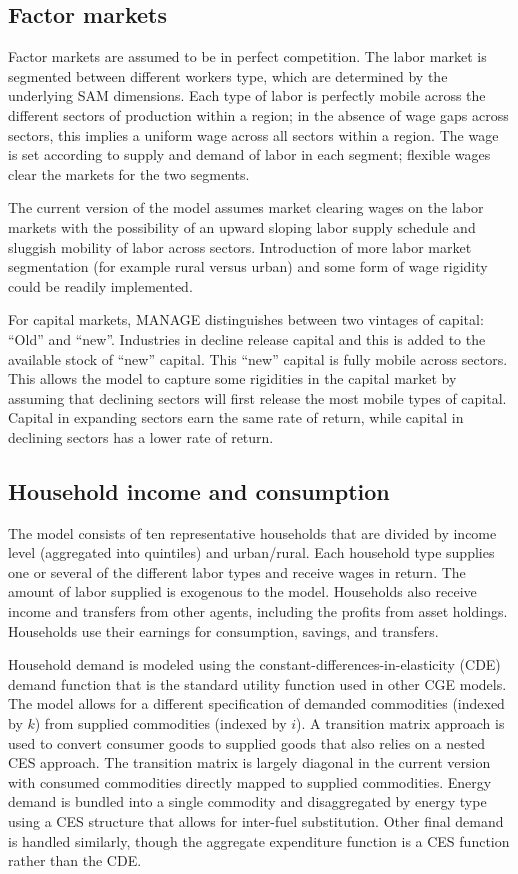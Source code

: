 \documentclass[11pt,english]{article}
\begin{document}
\subsection{Factor markets}

Factor markets are assumed to be in perfect competition. The labor market is segmented between different workers type, which are determined by the underlying SAM dimensions. Each type of labor is perfectly mobile across the different sectors of production within a region; in the absence of wage gaps across sectors, this implies a uniform wage across all sectors within a region. The wage is set according to supply and demand of labor in each segment; flexible wages clear the markets for the two segments.

The current version of the model assumes market clearing wages on the labor markets with the possibility of an upward sloping labor supply schedule and sluggish mobility of labor across sectors. Introduction of more labor market segmentation (for example rural versus urban) and some form of wage rigidity could be readily implemented.


For capital markets, MANAGE distinguishes between two vintages of capital: ``Old'' and ``new''. Industries in decline release capital and this is added to the available stock of ``new'' capital. This ``new'' capital is fully mobile across sectors. This allows the model to capture some rigidities in the capital market by assuming that declining sectors will first release the most mobile types of capital. Capital in expanding sectors earn the same rate of return, while capital in declining sectors has a lower rate of return.

\subsection{Household income and consumption}

The model consists of ten representative households that are divided by income level (aggregated into quintiles) and urban/rural. Each household type supplies one or several of the different labor types and receive wages in return. The amount of labor supplied is exogenous to the model. Households also receive income and transfers from other agents, including the profits from asset holdings. Households use their earnings for consumption, savings, and transfers.

Household demand is modeled using the constant-differences-in-elasticity (CDE) demand function that is the standard utility function used in other CGE models. The model allows for a different specification of demanded commodities (indexed by $k$) from supplied commodities (indexed by $i$). A transition matrix approach is used to convert consumer goods to supplied goods that also relies on a nested CES approach. The transition matrix is largely diagonal in the current version with consumed commodities directly mapped to supplied commodities. Energy demand is bundled into a single commodity and disaggregated by energy type using a CES structure that allows for inter-fuel substitution. Other final demand is handled similarly, though the aggregate expenditure function is a CES function rather than the CDE.
\end{document}
